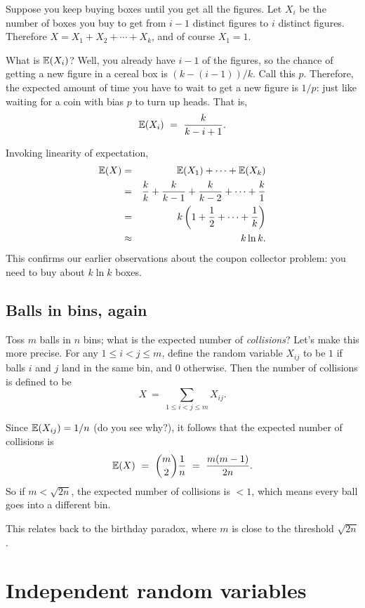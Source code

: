 Suppose you keep buying boxes until you get all the figures. Let $X_i$ be the number of 
boxes you buy to get from $i-1$ distinct figures to $i$ distinct figures. Therefore
$X = X_1 + X_2 + \cdots + X_k$, and of course $X_1 = 1$.

What is $\mathbb{E}(X_i)$? Well, you already have $i-1$ of the figures, so the chance of getting
a new figure in a cereal box is $(k-(i-1))/k$. Call this $p$. Therefore, the expected amount 
of time you have to wait to get a new figure is $1/p$: just like waiting for a coin with
bias $p$ to turn up heads. That is,
$$ \E(X_i) \ = \ \frac{k}{k-i+1} .$$

Invoking linearity of expectation,
\begin{eqnarray*}
\mathbb{E}(X) & = & \mathbb{E}(X_1) + \cdots + \mathbb{E}(X_k) \\
      & = & \frac{k}{k} + \frac{k}{k-1} + \frac{k}{k-2} + \cdots + \frac{k}{1} \\
      & = & k \left( 1 + \frac{1}{2} + \cdots + \frac{1}{k} \right) \\
      & \approx & k \ln k.
\end{eqnarray*}
This confirms our earlier observations about the coupon collector problem: you need
to buy about $k \ln k$ boxes.

\subsection{Balls in bins, again}

Toss $m$ balls in $n$ bins; what is the expected number of {\it collisions}? Let's make
this more precise. For any $1 \leq i < j \leq m$, define the random variable $X_{ij}$ to
be $1$ if balls $i$ and $j$ land in the same bin, and $0$ otherwise. Then the
number of collisions is defined to be
$$ X  \ = \ \sum_{1 \leq i < j \leq m} X_{ij} .$$

Since $\mathbb{E}(X_{ij}) = 1/n$ (do you see why?), it follows that the expected number of 
collisions is 
$$ \E(X) \ = \ {m \choose 2} \frac{1}{n} \ = \ \frac{m(m-1)}{2n} .$$
So if $m < \sqrt{2n}$, the expected number of collisions is $< 1$, which means
every ball goes into a different bin. 

This relates back to the birthday paradox, where $m$ is close to the threshold $\sqrt{2n}$.

\section{Independent random variables}

